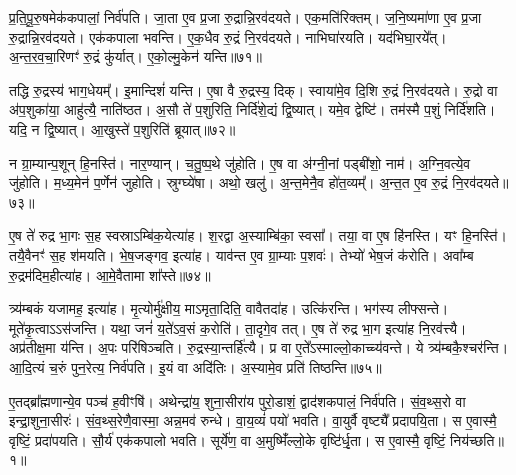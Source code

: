 प्र॒ति॒पू॒रु॒षमेक॑कपालां॒ निर्व॑पति।
जा॒ता ए॒व प्र॒जा रु॒द्रान्नि॒रव॑दयते।
एक॒मति॑रिक्तम्।
ज॒नि॒ष्यमा॑णा ए॒व प्र॒जा रु॒द्रान्नि॒रव॑दयते।
एक॑कपाला भवन्ति।
ए॒क॒धैव रु॒द्रं नि॒रव॑दयते।
नाभिघा॑रयति।
यद॑भिघा॒रये᳚त्।
अ॒न्त॒र॒व॒चा॒रिणꣳ॑ रु॒द्रं कु॑र्यात्।
ए॒को॒ल्मु॒केन॑ यन्ति॥७१॥

तद्धि रु॒द्रस्य॑ भाग॒धेयम्᳚।
इ॒मान्दिशं॑ यन्ति।
ए॒षा वै रु॒द्रस्य॒ दिक्।
स्वाया॑मे॒व दि॒शि रु॒द्रं नि॒रव॑दयते।
रु॒द्रो वा अ॑प॒शुका॑या॒ आहु॑त्यै॒ नाति॑ष्ठत।
अ॒सौ ते॑ प॒शुरिति॒ निर्दि॑शे॒द्यं द्वि॒ष्यात्।
यमे॒व द्वेष्टि॑।
तम॑स्मै प॒शुं निर्दि॑शति।
यदि॒ न द्वि॒ष्यात्।
आ॒खुस्ते॑ प॒शुरिति॑ ब्रूयात्॥७२॥

न ग्रा॒म्यान्प॒शून् हि॒नस्ति॑।
नार॒ण्यान्।
च॒तु॒ष्प॒थे जु॑होति।
ए॒ष वा अ॑ग्नी॒नां पड्बी॑शो॒ नाम॑।
अ॒ग्नि॒वत्ये॒व जु॑होति।
म॒ध्य॒मेन॑ प॒र्णेन॑ जुहोति।
स्रुग्घ्ये॑षा।
अथो॒ खलु॑।
अ॒न्त॒मेनै॒व हो॑त॒व्यम्᳚।
अ॒न्त॒त ए॒व रु॒द्रं नि॒रव॑दयते॥७३॥

ए॒ष ते॑ रुद्र भा॒गः स॒ह स्वस्रा\-ऽम्बि॑क॒येत्या॑ह।
श॒रद्वा अ॒स्याम्बि॑का॒ स्वसा᳚।
तया॒ वा ए॒ष हि॑नस्ति।
यꣳ हि॒नस्ति॑।
तयै॒वैनꣳ॑ स॒ह श॑मयति।
भे॒ष॒जङ्गव॒ इत्या॑ह।
याव॑न्त ए॒व ग्रा॒म्याः प॒शवः॑।
तेभ्यो॑ भेष॒जं क॑रोति।
अवा᳚म्ब रु॒द्रम॑दिम॒हीत्या॑ह।
आ॒\-मे॒वैतामा शा᳚स्ते॥७४॥

त्र्य॑म्बकं यजामह॒ इत्या॑ह।
मृ॒त्योर्मु॑क्षीय॒ माऽमृता॒दिति॒ वावैतदा॑ह।
उत्कि॑रन्ति।
भग॑स्य लीफ्सन्ते।
मूते॑कृ॒त्वा\-ऽऽस॑जन्ति।
यथा॒ जनं॑ य॒ते॑\-ऽव॒सं क॒रोति॑।
ता॒दृगे॒व तत्।
ए॒ष ते॑ रुद्र भा॒ग इत्या॑ह नि॒रव॑त्त्यै।
अप्र॑तीक्ष॒मा य॑न्ति।
अ॒पः परि॑षिञ्चति।
रु॒द्रस्या॒न्तर्\mbox{}हि॑त्यै।
प्र वा ए॒ते᳚\-ऽस्माल्लो॒काच्च्य॑वन्ते।
ये त्र्य॑म्बकै॒श्चर॑न्ति।
आ॒दि॒त्यं च॒रुं पुन॒रेत्य॒ निर्व॑पति।
इ॒यं वा अदि॑तिः।
अ॒स्यामे॒व प्रति॑ तिष्ठन्ति॥७५॥\anuvakamend[य॒न्ति॒ ब्रू॒या॒न्नि॒रव॑दयते शास्ते सिञ्चति॒ षट्च॑]




\clearpage
{}
\setcounter{anuvakam}{0}

ए॒तद्ब्रा᳚ह्मणान्ये॒व पञ्च॑ ह॒वीꣳषि॑।
अथेन्द्रा॑य॒ शुना॒सीरा॑य पुरो॒डाशं॒ द्वाद॑शकपालं॒ निर्व॑पति।
सं॒व॒थ्स॒रो वा इन्द्रा॒शुना॒सीरः॑।
सं॒व॒थ्स॒रेणै॒वास्मा॒ अन्न॒मव॑ रुन्धे।
वा॒य॒व्यं॑ पयो॑ भवति।
वा॒युर्वै वृष्ट्यै᳚ प्रदापयि॒ता।
स ए॒वास्मै॒ वृष्टिं॒ प्रदा॑पयति।
सौ॒र्य॑ एक॑कपालो भवति।
सूर्ये॑ण॒ वा अ॒मुष्मिँ॑ल्लो॒के वृष्टि॑र्धृ॒ता।
स ए॒वास्मै॒ वृष्टिं॒ निय॑च्छति॥१॥

